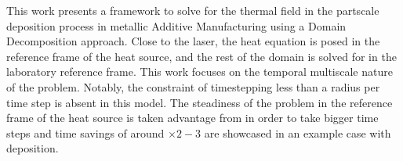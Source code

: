 This work presents a framework to solve for
the thermal field in the partscale deposition
process in metallic Additive Manufacturing
using a Domain Decomposition approach.
Close to the laser, the heat equation is posed
in the reference
frame of the heat source,
and the rest of the domain is solved
for in the laboratory reference frame.
This work focuses on the temporal multiscale
nature of the problem. Notably, the constraint
of timestepping less than a radius per time step
is absent in this model. The steadiness
of the problem in the reference frame of the heat source
is taken advantage from in order to take bigger time steps
and time savings of around $\times 2-3$ are showcased
in an example case with deposition.
